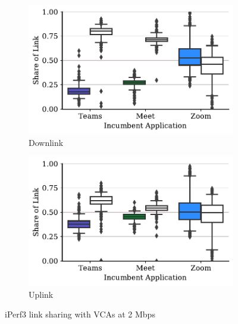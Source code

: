 \begin{figure}[t!]
\centering
\begin{subfigure}[t]{.4\textwidth}
    \centering
    \includegraphics[width=1\textwidth]{figures/comp/box_plot_iperf_dl_2.0_all.pdf}
    \caption{Downlink}
    \label{fig:boxplot-iperf-dl}
\end{subfigure}\hfill
\begin{subfigure}[t]{.4\textwidth}
    \centering
    \includegraphics[width=1\textwidth]{figures/comp/box_plot_iperfup_ul_2.0_all.pdf}
    \caption{Uplink}
    \label{subfig:boxplot-iperf-ul}
\end{subfigure}
\caption{iPerf3 link sharing with VCAs at 2 Mbps}
\label{fig:boxplot-iperf}
\end{figure}

